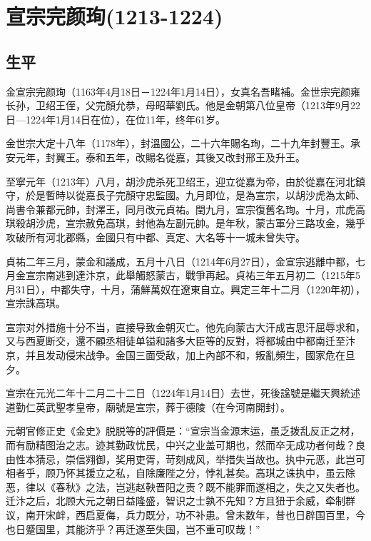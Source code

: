 
\section{宣宗完颜珣\tiny(1213-1224)}

\subsection{生平}

金宣宗完颜珣（1163年4月18日－1224年1月14日），女真名吾睹補。金世宗完颜雍长孙，卫绍王侄，父完顏允恭，母昭華劉氏。他是金朝第八位皇帝（1213年9月22日—1224年1月14日在位），在位11年，终年61岁。

金世宗大定十八年（1178年），封溫國公，二十六年賜名珣，二十九年封豐王。承安元年，封翼王。泰和五年，改賜名從嘉，其後又改封邢王及升王。

至寧元年（1213年）八月，胡沙虎杀死卫绍王，迎立從嘉为帝，由於從嘉在河北鎮守，於是暫時以從嘉長子完顏守忠監國。九月即位，是為宣宗，以胡沙虎為太師、尚書令兼都元帥，封澤王，同月改元貞祐。閏九月，宣宗復舊名珣。十月，朮虎高琪殺胡沙虎，宣宗赦免高琪，封他為左副元帥。是年秋，蒙古軍分三路攻金，幾乎攻破所有河北郡縣，金國只有中都、真定、大名等十一城未曾失守。

貞祐二年三月，蒙金和議成，五月十八日（1214年6月27日），金宣宗逃離中都，七月金宣宗南逃到達汴京，此舉觸怒蒙古，戰爭再起。貞祐三年五月初二（1215年5月31日），中都失守，十月，蒲鮮萬奴在遼東自立。興定三年十二月（1220年初），宣宗誅高琪。

宣宗对外措施十分不当，直接导致金朝灭亡。他先向蒙古大汗成吉思汗屈辱求和，又与西夏断交，還不顧丞相徒单镒和諸多大臣等的反對，将都城由中都南迁至汴京，并且发动侵宋战争。金国三面受敌，加上內部不和，叛亂頻生，國家危在旦夕。

宣宗在元光二年十二月二十二日（1224年1月14日）去世，死後諡號是繼天興統述道勤仁英武聖孝皇帝，廟號是宣宗，葬于德陵（在今河南開封）。

元朝官修正史《金史》脱脱等的評價是：“宣宗当金源末运，虽乏拨乱反正之材，而有励精图治之志。迹其勤政忧民，中兴之业盖可期也，然而卒无成功者何哉？良由性本猜忌，崇信翙御，奖用吏胥，苛刻成风，举措失当故也。执中元恶，此岂可相者乎，顾乃怀其援立之私，自除廉陛之分，悖礼甚矣。高琪之诛执中，虽云除恶，律以《春秋》之法，岂逃赵鞅晋阳之责？既不能罪而遂相之，失之又失者也。迁汴之后，北顾大元之朝日益隆盛，智识之士孰不先知？方且狃于余威，牵制群议，南开宋衅，西启夏侮，兵力既分，功不补患。曾未数年，昔也日辟国百里，今也日蹙国里，其能济乎？再迁遂至失国，岂不重可叹哉！”

